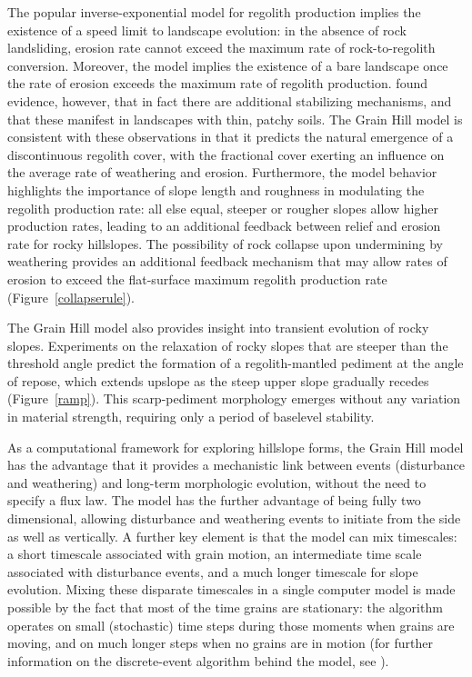 \documentclass[esurf, manuscript]{copernicus}
\begin{document}
The popular inverse-exponential model for regolith production implies the existence of a speed limit to landscape evolution: in the absence of rock landsliding, erosion rate cannot exceed the maximum rate of rock-to-regolith conversion. Moreover, the model implies the existence of a bare landscape once the rate of erosion exceeds the maximum rate of regolith production. \citet{heimsath2012soil} found evidence, however, that in fact there are additional stabilizing mechanisms, and that these manifest in landscapes with thin, patchy soils. The 
Grain Hill model is consistent with these observations in that it predicts the natural emergence of a discontinuous regolith cover, with the fractional cover exerting an influence on the average rate of weathering and erosion. Furthermore, the model behavior highlights the importance of slope length and roughness in modulating the regolith production rate: all else equal, steeper or rougher slopes allow higher production rates, leading to an additional feedback between relief and erosion rate for rocky hillslopes. The possibility of rock collapse upon undermining by weathering provides an additional feedback mechanism that may allow rates of erosion to exceed the flat-surface maximum regolith production rate (Figure~\ref{collapserule}).

The Grain Hill model also provides insight into transient evolution of rocky slopes. Experiments on the relaxation of rocky slopes that are steeper than the threshold angle predict the formation of a regolith-mantled pediment at the angle of repose, which extends upslope as the steep upper slope gradually recedes (Figure~\ref{ramp}). This scarp-pediment morphology emerges without any variation in material strength, requiring only a period of baselevel stability.

As a computational framework for exploring hillslope forms, the Grain Hill model has the advantage that it provides a mechanistic link between events (disturbance and weathering) and long-term morphologic evolution, without the need to specify a flux law. The model has the further advantage of being fully two dimensional, allowing disturbance and weathering events to initiate from the side as well as vertically. A further key element is that the model can mix timescales: a short timescale associated with grain motion, an intermediate time scale associated with disturbance events, and a much longer timescale for slope evolution. Mixing these disparate timescales in a single computer model is made possible by the fact that most of the time grains are stationary: the algorithm operates on small (stochastic) time steps during those moments when grains are moving, and on much longer steps when no grains are in motion (for further information on the discrete-event algorithm behind the model, see \citet{tucker2016celllab}).
\end{document}
